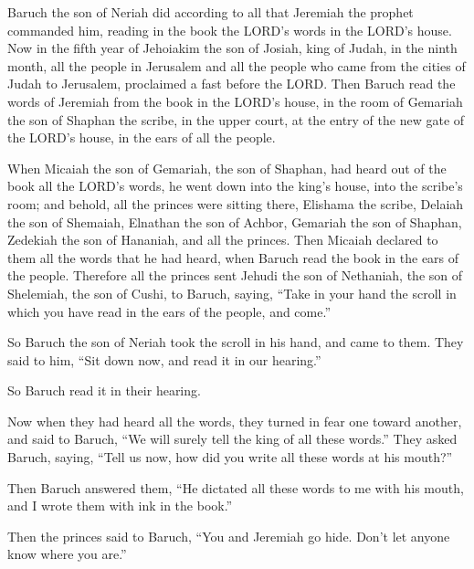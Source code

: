 \myverse{}Baruch the son of Neriah did according to all that Jeremiah the prophet commanded him, reading in the book the LORD’s words in the LORD’s house. \myverse{}Now in the fifth year of Jehoiakim the son of Josiah, king of Judah, in the ninth month, all the people in Jerusalem and all the people who came from the cities of Judah to Jerusalem, proclaimed a fast before the LORD. \myverse{}Then Baruch read the words of Jeremiah from the book in the LORD’s house, in the room of Gemariah the son of Shaphan the scribe, in the upper court, at the entry of the new gate of the LORD’s house, in the ears of all the people.


\myverse{}When Micaiah the son of Gemariah, the son of Shaphan, had heard out of the book all the LORD’s words, \myverse{}he went down into the king’s house, into the scribe’s room; and behold, all the princes were sitting there, Elishama the scribe, Delaiah the son of Shemaiah, Elnathan the son of Achbor, Gemariah the son of Shaphan, Zedekiah the son of Hananiah, and all the princes. \myverse{}Then Micaiah declared to them all the words that he had heard, when Baruch read the book in the ears of the people. \myverse{}Therefore all the princes sent Jehudi the son of Nethaniah, the son of Shelemiah, the son of Cushi, to Baruch, saying, “Take in your hand the scroll in which you have read in the ears of the people, and come.”

So Baruch the son of Neriah took the scroll in his hand, and came to them. \myverse{}They said to him, “Sit down now, and read it in our hearing.”

So Baruch read it in their hearing.


\myverse{}Now when they had heard all the words, they turned in fear one toward another, and said to Baruch, “We will surely tell the king of all these words.” \myverse{}They asked Baruch, saying, “Tell us now, how did you write all these words at his mouth?”


\myverse{}Then Baruch answered them, “He dictated all these words to me
with his mouth, and I wrote them with ink in the book.”


\myverse{}Then the princes said to Baruch, “You and Jeremiah go hide. Don’t let anyone know where you are.”


